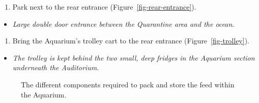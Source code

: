 \documentclass[
  letterpaper,
  DIV=11,
  numbers=noendperiod]{scrreprt}
\providecommand{\tightlist}{%
  \setlength{\itemsep}{0pt}\setlength{\parskip}{0pt}}\usepackage{longtable,booktabs,array}
\begin{document}
\begin{enumerate}
\def\labelenumi{\arabic{enumi}.}
\setcounter{enumi}{14}
\tightlist
\item
  Park next to the rear entrance (Figure~\ref{fig-rear-entrance}).
\end{enumerate}

\begin{itemize}
\tightlist
\item
  \emph{Large double door entrance between the Quarantine area and the
  ocean}.
\end{itemize}

\begin{enumerate}
\def\labelenumi{\arabic{enumi}.}
\setcounter{enumi}{15}
\tightlist
\item
  Bring the Aquarium's trolley cart to the rear entrance
  (Figure~\ref{fig-trolley}).
\end{enumerate}

\begin{itemize}
\tightlist
\item
  \emph{The trolley is kept behind the two small, deep fridges in the
  Aquarium section underneath the Auditorium}.
\end{itemize}

\begin{figure}[H]

\begin{minipage}[t]{0.33\linewidth}

{\centering 


}

\end{minipage}%
%
\begin{minipage}[t]{0.33\linewidth}

{\centering 


}

\end{minipage}%
%
\begin{minipage}[t]{0.33\linewidth}

{\centering 


}

\end{minipage}%

\caption{\label{fig-feed-packing}The different components required to
pack and store the feed within the Aquarium.}

\end{figure}
\end{document}

